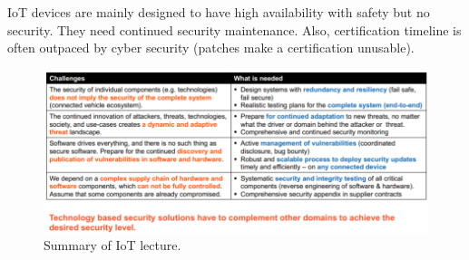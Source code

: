 IoT devices are mainly designed to have high availability with safety but no security. They need continued security maintenance. Also, certification timeline is often outpaced by cyber security (patches make a certification unusable).

\begin{figure}[h]
	\centering
	\includegraphics[scale=0.8]{images/913-conclusion.PNG}
	\caption{Summary of IoT lecture.}
	\label{fig:conclusion}
\end{figure}